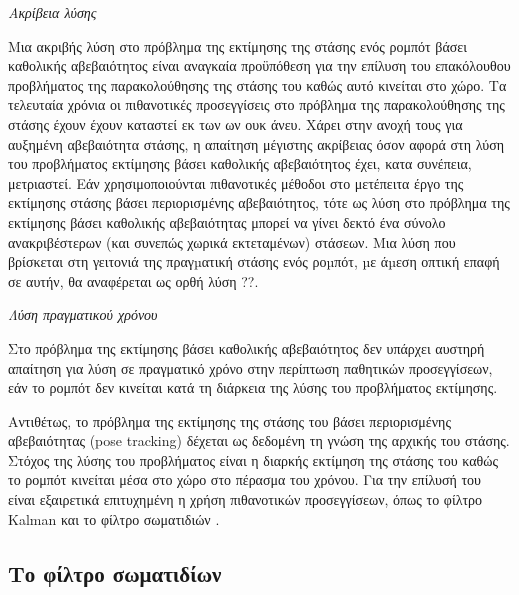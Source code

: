 \begin{gg_box}
\begin{remark}
  \label{remark:01_01_02_02:01}
  \textit{Ακρίβεια λύσης}

  Μια ακριβής λύση στο πρόβλημα της εκτίμησης της στάσης ενός ρομπότ βάσει
  καθολικής αβεβαιότητος είναι αναγκαία προϋπόθεση για την επίλυση του
  επακόλουθου προβλήματος της παρακολούθησης της στάσης του καθώς αυτό κινείται
  στο χώρο. Τα τελευταία χρόνια οι πιθανοτικές προσεγγίσεις στο πρόβλημα της
  παρακολούθησης της στάσης έχουν έχουν καταστεί εκ των ων ουκ άνευ. Χάρει στην
  ανοχή τους για αυξημένη αβεβαιότητα στάσης, η απαίτηση μέγιστης ακρίβειας
  όσον αφορά στη λύση του προβλήματος εκτίμησης βάσει καθολικής αβεβαιότητος
  έχει, κατα συνέπεια, μετριαστεί. Εάν χρησιμοποιούνται πιθανοτικές μέθοδοι στο
  μετέπειτα έργο της εκτίμησης στάσης βάσει περιορισμένης αβεβαιότητος, τότε ως
  λύση στο πρόβλημα της εκτίμησης βάσει καθολικής αβεβαιότητας μπορεί να γίνει
  δεκτό ένα σύνολο ανακριβέστερων (και συνεπώς χωρικά εκτεταμένων) στάσεων. Μια
  λύση που βρίσκεται στη γειτονιά της πραγµατική στάσης ενός ροµπότ, µε άµεση
  οπτική επαφή σε αυτήν, θα αναφέρεται ως ορθή λύση ??.
\end{remark}
\end{gg_box}


\begin{gg_box}
\begin{remark}
  \textit{Λύση πραγματικού χρόνου}
  \label{remark:01_01_02_02:02}

  Στο πρόβλημα της εκτίμησης βάσει καθολικής αβεβαιότητος δεν υπάρχει αυστηρή
  απαίτηση για λύση σε πραγματικό χρόνο στην περίπτωση παθητικών προσεγγίσεων,
  εάν το ρομπότ δεν κινείται κατά τη διάρκεια της λύσης του προβλήματος
  εκτίμησης.
\end{remark}
\end{gg_box}

Αντιθέτως, το πρόβλημα της εκτίμησης της στάσης του βάσει περιορισμένης
αβεβαιότητας (pose tracking) δέχεται ως δεδομένη τη γνώση της αρχικής του
στάσης. Στόχος της λύσης του προβλήματος είναι η διαρκής εκτίμηση της στάσης
του καθώς το ρομπότ κινείται μέσα στο χώρο στο πέρασμα του χρόνου. Για την
επίλυσή του είναι εξαιρετικά επιτυχημένη η χρήση πιθανοτικών προσεγγίσεων, όπως
το φίλτρο Kalman \cite{Maybeck1979} και το φίλτρο σωματιδιών
\cite{Thrun2002a,Gustafsson2002}.

\subsection{Το φίλτρο σωματιδίων}
\label{subsec:01_01_02_3}

